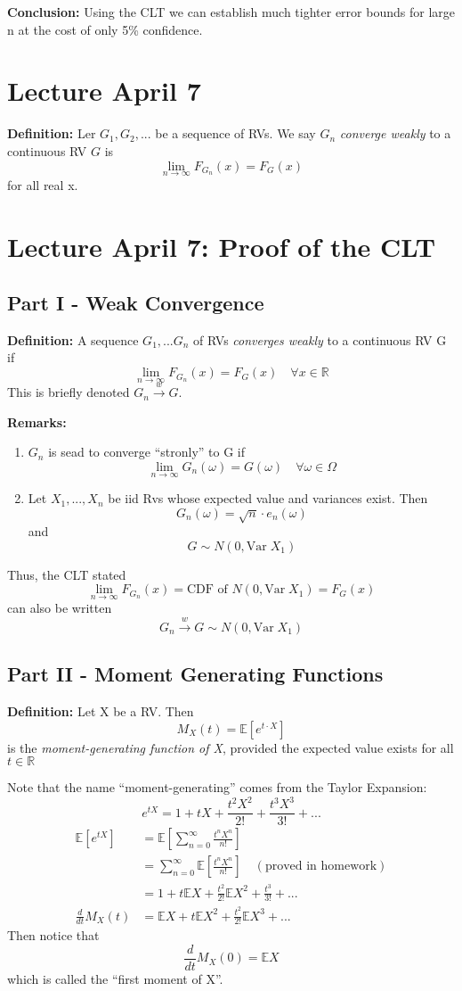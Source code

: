\documentclass[12pt]{article}
\newcommand{\R}{\mathbb{R}}
\newcommand{\E}{\mathbb{E}}
\newcommand{\Var}{\text{Var}\;}
\begin{document}
\textbf{Conclusion:} Using the CLT we can establish much tighter error bounds for large n at the cost of only 5\% confidence. 

\section{Lecture April 7}
\textbf{Definition:} Ler $G_1, G_2, ...$ be a sequence of RVs. We say $G_n$ \emph{converge weakly} to a continuous RV $G$ is 
\[\lim_{n\to \infty} F_{G_n}(x) = F_G(x)\]
for all real x.

\section*{Lecture April 7: Proof of the CLT}
\subsection*{Part I - Weak Convergence}
\textbf{Definition:} A sequence $G_1, ...G_n$ of RVs \emph{converges weakly} to a continuous RV G if 
\[\lim_{n \to \infty} F_{G_n}(x) = F_G(x) \quad \forall x \in \R\]
This is briefly denoted $G_n \overset{w}{\to} G$.

\textbf{Remarks:}
\begin{enumerate}
    \item $G_n$ is sead to converge ``stronly'' to G if 
    \[\lim_{n\to \infty} G_n(\omega) = G(\omega) \quad \forall \omega \in \Omega\]

    \item Let $X_1, ..., X_n$ be iid Rvs whose expected value and variances exist. Then 
    \[G_n(\omega) = \sqrt{n} \cdot e_n(\omega)\]
    and 
    \[G \sim N(0, \Var X_1)\]
\end{enumerate}

Thus, the CLT stated 
\[\lim_{n\to \infty} F_{G_n}(x) = \text{CDF of } N(0, \Var X_1) = F_G(x)\]
can also be written 
\[G_n \overset{w}{\to} G \sim N(0, \Var X_1)\]

\subsection*{Part II - Moment Generating Functions}
\textbf{Definition:} Let X be a RV. 
Then
\[M_X(t) = \E [e^{t \cdot X}]\]
is the \emph{moment-generating function of X},
provided the expected value exists for all $t\in \R$

Note that the name ``moment-generating'' comes from the Taylor Expansion:
\[e^{tX} = 1 + tX + \frac{t^2X^2}{2!} + \frac{t^3X^3}{3!} + ...\]
\begin{align*}
    \E[e^{tX}] &= \E\left[\sum_{n=0}^\infty \frac{t^nX^n}{n!}\right]\\
    &= \sum_{n=0}^\infty \E\left[\frac{t^nX^n}{n!}\right] \quad (\text{proved in homework})\\
    &= 1 + t\E X + \frac{t^2}{2!}\E X^2 + \frac{t^3}{3!} + ...\\
    \frac{d}{dt} M_X(t) &= \E X + t\E X^2 + \frac{t^2}{2!} \E X^3 +...
\end{align*}
Then notice that 
\[\frac{d}{dt} M_X(0) = \E X\]
which is called the ``first moment of X''.
\end{document}
